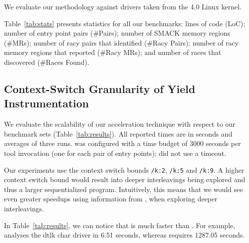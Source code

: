 We evaluate our methodology against \sizeOfBenchmarks drivers taken from the 4.0 Linux kernel. 

Table~\ref{tab:stats} presents statistics for all our benchmarks: lines of code (LoC); number of entry point pairs (\#Pairs); number of SMACK memory regions (\#MRs); number of racy pairs that \whoop identified (\#Racy Pairs); number of racy memory regions that \whoop reported (\#Racy MRs); and number of races that \corral discovered (\#Races Found).

\subsection{Context-Switch Granularity of Yield Instrumentation}
\label{eval:granularity}

We evaluate the scalability of our acceleration technique with respect to our benchmark sets (Table~\ref{tab:results}). All reported times are in seconds and averages of three runs. \corral was configured with a time budget of 3000 seconds per tool invocation (one for each pair of entry points); \whoop did not use a timeout.

Our experiments use the \corral context switch bounds \texttt{/k:2}, \texttt{/k:5} and \texttt{/k:9}. A higher context switch bound would result into deeper interleavings being explored and thus a larger sequentialized program. Intuitively, this means that we would see even greater speedups using information from \whoop, when exploring deeper interleavings.


In Table~\ref{tab:results}, we can notice that \whoop is much faster than \corral. For example, \whoop analyses the dtlk char driver in 6.51 seconds, whereas \corral requires 1287.05 seconds.


